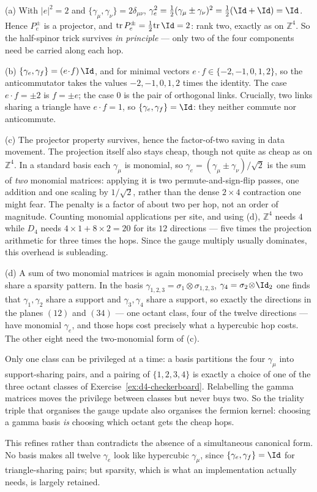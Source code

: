 {(a) With $|e|^2=2$ and $\{\gamma_\mu,\gamma_\nu\}=2\delta_{\mu\nu}$,
$\gamma_e^2=\tfrac12(\gamma_\mu\pm\gamma_\nu)^2
=\tfrac12(\Id+\Id)=\Id$. Hence $P_e^\pm$ is a projector,
and $\mathrm{tr}\,P_e^\pm=\tfrac12\mathrm{tr}\,\Id=2$: rank two, exactly
as on $\mathbb{Z}^4$. So the half-spinor trick survives \emph{in principle} ---
only two of the four components need be carried along each hop.

(b) $\{\gamma_e,\gamma_f\}=(e\!\cdot\!f)\,\Id$, and for minimal vectors
$e\cdot f\in\{-2,-1,0,1,2\}$, so the anticommutator takes the values
$-2,-1,0,1,2$ times the identity. The case $e\cdot f=\pm2$ is $f=\pm e$; the
case $0$ is the pair of orthogonal links. Crucially, two links sharing a
triangle have $e\cdot f=1$, so $\{\gamma_e,\gamma_f\}=\Id$: they neither
commute nor anticommute.

(c) The projector property survives, hence the factor-of-two saving in data
movement. The projection itself also stays cheap, though not quite as cheap as
on $\mathbb{Z}^4$. In a standard basis each $\gamma_\mu$ is monomial, so
$\gamma_e=(\gamma_\mu\pm\gamma_\nu)/\sqrt2$ is the sum of \emph{two} monomial
matrices: applying it is two permute-and-sign-flip passes, one addition and one
scaling by $1/\sqrt2$, rather than the dense $2\times4$ contraction one might
fear. The penalty is a factor of about two per hop, not an order of magnitude.
Counting monomial applications per site, and using (d), $\mathbb{Z}^4$ needs
$4$ while $D_4$ needs $4\times1+8\times2=20$ for its $12$ directions --- five
times the projection arithmetic for three times the hops. Since the gauge
multiply usually dominates, this overhead is subleading.

(d) A sum of two monomial matrices is again monomial precisely when the two
share a sparsity pattern. In the basis
$\gamma_{1,2,3}=\sigma_1\!\otimes\!\sigma_{1,2,3}$,
$\gamma_4=\sigma_2\!\otimes\!\Id_2$ one finds that $\gamma_1,\gamma_2$ share a
support and $\gamma_3,\gamma_4$ share a support, so exactly the directions in
the planes $(12)$ and $(34)$ --- one octant class, four of the twelve
directions --- have monomial $\gamma_e$, and those hops cost precisely what a
hypercubic hop costs. The other eight need the two-monomial form of (c).

Only one class can be privileged at a time: a basis partitions the four
$\gamma_\mu$ into support-sharing pairs, and a pairing of $\{1,2,3,4\}$ is
exactly a choice of one of the three octant classes of
Exercise~\ref{ex:d4-checkerboard}. Relabelling the gamma matrices moves the
privilege between classes but never buys two. So the triality triple that
organises the gauge update also organises the fermion kernel: choosing a gamma
basis \emph{is} choosing which octant gets the cheap hops.

This refines rather than contradicts the absence of a simultaneous canonical
form. No basis makes all twelve $\gamma_e$ look like hypercubic $\gamma_\mu$,
since $\{\gamma_e,\gamma_f\}=\Id$ for triangle-sharing pairs; but sparsity,
which is what an implementation actually needs, is largely retained.}

